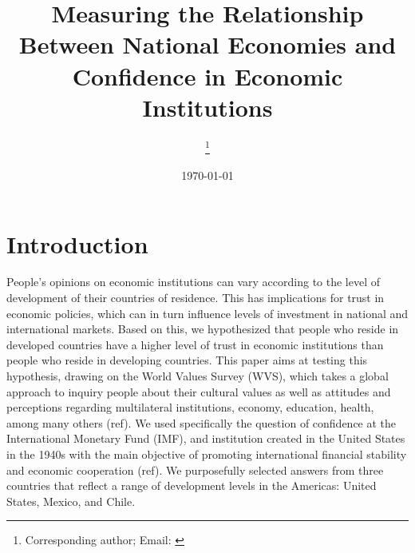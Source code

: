 \documentclass[12pt,halfline,a4paper,]{ouparticle}
\begin{document}
\title{Measuring the Relationship Between National Economies and Confidence in
Economic Institutions}

\author{%
\address{Department of Anthropology, University of Georgia}
\and
{}\address{Department of Political Science, University of Georgia}\thanks{Corresponding author; Email: \href{mailto:}{}}
}


\date{\today}


\maketitle



\hypertarget{introduction}{%
\section{Introduction}\label{introduction}}

People's opinions on economic institutions can vary according to the
level of development of their countries of residence. This has
implications for trust in economic policies, which can in turn influence
levels of investment in national and international markets. Based on
this, we hypothesized that people who reside in developed countries have
a higher level of trust in economic institutions than people who reside
in developing countries. This paper aims at testing this hypothesis,
drawing on the World Values Survey (WVS), which takes a global approach
to inquiry people about their cultural values as well as attitudes and
perceptions regarding multilateral institutions, economy, education,
health, among many others (ref). We used specifically the question of
confidence at the International Monetary Fund (IMF), and institution
created in the United States in the 1940s with the main objective of
promoting international financial stability and economic cooperation
(ref). We purposefully selected answers from three countries that
reflect a range of development levels in the Americas: United States,
Mexico, and Chile.
\end{document}
